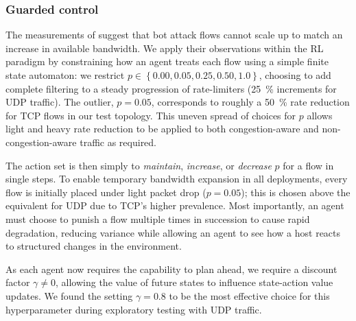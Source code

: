 \documentclass[10pt, times, comsoc]{IEEEtran}
\begin{document}
\subsubsection{Guarded control}
The measurements of \textcite{DBLP:conf/ndss/KangGS16} suggest that bot attack flows cannot scale up to match an increase in available bandwidth.
We apply their observations within the RL paradigm by constraining how an agent treats each flow using a simple finite state automaton: we restrict $p \in \left\{ 0.00, 0.05, 0.25, 0.50, 1.0 \right\}$, choosing to add complete filtering to a steady progression of rate-limiters (\SI{25}{\percent} increments for UDP traffic).
The outlier, $p=0.05$, corresponds to roughly a \SI{50}{\percent} rate reduction for TCP flows in our test topology.
This uneven spread of choices for $p$ allows light and heavy rate reduction to be applied to both congestion-aware and non-congestion-aware traffic as required.

The action set is then simply to \emph{maintain}, \emph{increase}, or \emph{decrease} $p$ for a flow in single steps.
To enable temporary bandwidth expansion in all deployments, every flow is initially placed under light packet drop ($p=0.05$); this is chosen above the equivalent for UDP due to TCP's higher prevalence.
Most importantly, an agent must choose to punish a flow multiple times in succession to cause rapid degradation, reducing variance while allowing an agent to see how a host reacts to structured changes in the environment.

As each agent now requires the capability to plan ahead, we require a discount factor $\gamma \ne 0$, allowing the value of future states to influence state-action value updates.
We found the setting $\gamma = 0.8$ to be the most effective choice for this hyperparameter during exploratory testing with UDP traffic.
\end{document}
